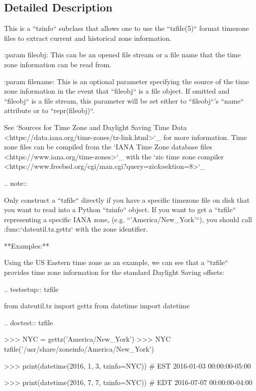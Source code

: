\subsection{Detailed Description}
\begin{DoxyVerb}This is a ``tzinfo`` subclass that allows one to use the ``tzfile(5)``
format timezone files to extract current and historical zone information.

:param fileobj:
    This can be an opened file stream or a file name that the time zone
    information can be read from.

:param filename:
    This is an optional parameter specifying the source of the time zone
    information in the event that ``fileobj`` is a file object. If omitted
    and ``fileobj`` is a file stream, this parameter will be set either to
    ``fileobj``'s ``name`` attribute or to ``repr(fileobj)``.

See `Sources for Time Zone and Daylight Saving Time Data
<https://data.iana.org/time-zones/tz-link.html>`_ for more information.
Time zone files can be compiled from the `IANA Time Zone database files
<https://www.iana.org/time-zones>`_ with the `zic time zone compiler
<https://www.freebsd.org/cgi/man.cgi?query=zic&sektion=8>`_

.. note::

    Only construct a ``tzfile`` directly if you have a specific timezone
    file on disk that you want to read into a Python ``tzinfo`` object.
    If you want to get a ``tzfile`` representing a specific IANA zone,
    (e.g. ``'America/New_York'``), you should call
    :func:`dateutil.tz.gettz` with the zone identifier.


**Examples:**

Using the US Eastern time zone as an example, we can see that a ``tzfile``
provides time zone information for the standard Daylight Saving offsets:

.. testsetup:: tzfile

    from dateutil.tz import gettz
    from datetime import datetime

.. doctest:: tzfile

    >>> NYC = gettz('America/New_York')
    >>> NYC
    tzfile('/usr/share/zoneinfo/America/New_York')

    >>> print(datetime(2016, 1, 3, tzinfo=NYC))     # EST
    2016-01-03 00:00:00-05:00

    >>> print(datetime(2016, 7, 7, tzinfo=NYC))     # EDT
    2016-07-07 00:00:00-04:00



\end{DoxyVerb}
